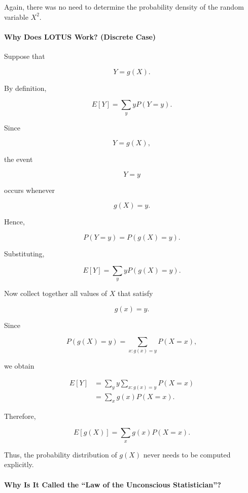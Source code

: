 \documentclass[11pt]{article}
\begin{document}
\begin{mdframed}[
		linewidth=0.8pt,
		roundcorner=6pt,
		backgroundcolor=gray!5,
		linecolor=gray!60,
		innertopmargin=10pt,
		innerbottommargin=10pt,
		innerleftmargin=10pt,
		innerrightmargin=10pt
		]
		Again, there was no need to determine the probability density of the random
		variable $X^2$.
		
		\bigskip
		
		\paragraph{Why Does LOTUS Work? (Discrete Case)}
		
		Suppose that
		
		\[
		Y=g(X).
		\]
		
		By definition,
		
		\[
		E[Y]
		=
		\sum_y
		yP(Y=y).
		\]
		
		Since
		
		\[
		Y=g(X),
		\]
		
		the event
		
		\[
		Y=y
		\]
		
		occurs whenever
		
		\[
		g(X)=y.
		\]
		
		Hence,
		
		\[
		P(Y=y)
		=
		P(g(X)=y).
		\]
		
		Substituting,
		
		\[
		E[Y]
		=
		\sum_y
		yP(g(X)=y).
		\]
		
		Now collect together all values of $X$ that satisfy
		
		\[
		g(x)=y.
		\]
		
		Since
		
		\[
		P(g(X)=y)
		=
		\sum_{x:g(x)=y}
		P(X=x),
		\]
		
		we obtain
		
		\[
		\begin{aligned}
			E[Y]
			&=
			\sum_y
			y
			\sum_{x:g(x)=y}
			P(X=x)
			\\[0.3cm]
			&=
			\sum_x
			g(x)P(X=x).
		\end{aligned}
		\]
		
		Therefore,
		
		\[
		\boxed{
			E[g(X)]
			=
			\sum_x
			g(x)P(X=x).
		}
		\]
		
		Thus, the probability distribution of $g(X)$ never needs to be computed
		explicitly.
		
		\bigskip
		
		\paragraph{Why Is It Called the ``Law of the Unconscious Statistician''?}
		

\end{mdframed}
\end{document}
